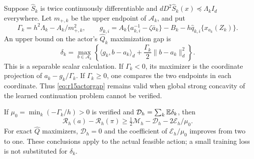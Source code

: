 \begin{proposition}
\label{prop:r15actorgap}
Suppose $\widehat S_k$ is twice continuously differentiable and
$dD^2\widehat S_k(x)\preceq\Lambda_k I_d$ everywhere. Let
$m_{+,k}$ be the upper endpoint of $\mathcal A_k$, and put
\[
 \Gamma_k=h^2\Lambda_k-A_k/m_{+,k}^2,\qquad
 g_{k,i}=A_k\{a_{k,i}^{-1}-\zeta\bar a_k\}
                    -B_k-h\widehat q_{k,i}\{x_{a_k}(Z_k)\}.
\]
An upper bound on the actor's $\widehat Q_k$ maximization gap is
\begin{equation}
 \delta_k=\max_{b\in\mathcal A_k}
     \left\{\langle g_k,b-a_k\rangle_d
                      +\frac{\Gamma_k}{2}\|b-a_k\|_d^2\right\}.
 \label{eq:r15actorgap}
\end{equation}
This is a separable scalar calculation. If $\Gamma_k<0$, its maximizer
is the coordinate projection of $a_k-g_k/\Gamma_k$. If
$\Gamma_k\geq0$, one compares the two endpoints in each coordinate.
Thus \eqref{eq:r15actorgap} remains valid when global strong concavity
of the learned continuation problem cannot be verified.

If $\mu_0=\min_k(-\Gamma_k/h)>0$ is verified and
$\mathcal D_h=\sum_k\mathbb E\delta_k$, then
\begin{equation}
 \mathcal R_h(a)-\mathcal R_h(\pi)
       \geq\tfrac12\mathcal M_h-\mathcal D_h
                            -2\mathcal E_h/\mu_0.
 \label{eq:r15quadratic}
\end{equation}
For exact $\widehat Q$ maximizers, $\mathcal D_h=0$ and the coefficient
of $\mathcal E_h/\mu_0$ improves from two to one. These conclusions
apply to the actual feasible action; a small training loss is not
substituted for $\delta_k$.
\end{proposition}

